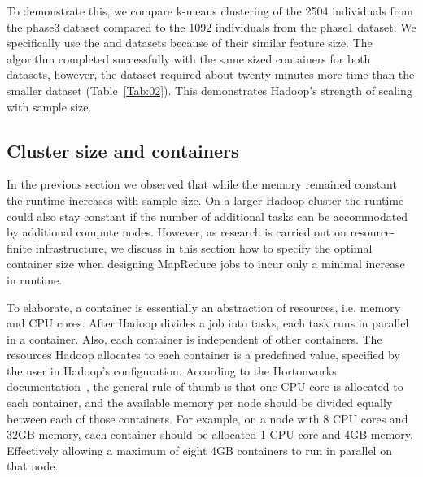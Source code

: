 \documentclass{bioinfo}
\begin{document}
To demonstrate this, we compare k-means clustering of the 2504 individuals from the phase3 dataset compared to the 1092 individuals from the phase1 dataset.
We specifically use the \SevenPhaseone{} and \ThreePhasethree{} datasets because of their similar feature size.
The algorithm completed successfully with the same sized containers for both datasets, however, the \ThreePhasethree{} dataset required about twenty minutes more time than the smaller \SevenPhaseone{} dataset (Table~\ref{Tab:02}). 
This demonstrates Hadoop's strength of scaling with sample size. 


\subsection*{Cluster size and containers}
In the previous section we observed that while the memory remained constant the runtime increases with sample size. 
On a larger Hadoop cluster the runtime could also stay constant if the number of additional tasks can be accommodated by additional compute nodes. 
However, as research is carried out on resource-finite infrastructure, we discuss in this section how to specify the optimal container size when designing MapReduce jobs to incur only a minimal increase in runtime. 

To elaborate, a container is essentially an abstraction of resources, i.e. memory and CPU cores. 
After Hadoop divides a job into tasks, each task runs in parallel in a container. Also, each container is independent of other containers.
The resources Hadoop allocates to each container is a predefined value, specified by the user in Hadoop's configuration. 
According to the Hortonworks documentation~\citep{Horton2013}, the general rule of thumb is that one CPU core is allocated to each container, and the available memory per node should be divided equally between each of those containers. 
For example, on a node with 8 CPU cores and 32GB memory, each container should be allocated 1 CPU core and 4GB memory. Effectively allowing a maximum of eight 4GB containers to run in parallel on that node.
\end{document}
